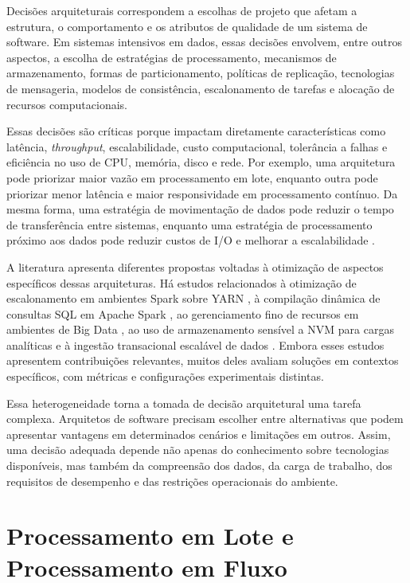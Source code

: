 Decisões arquiteturais correspondem a escolhas de projeto que afetam a estrutura, o comportamento e os atributos de qualidade de um sistema de software. Em sistemas intensivos em dados, essas decisões envolvem, entre outros aspectos, a escolha de estratégias de processamento, mecanismos de armazenamento, formas de particionamento, políticas de replicação, tecnologias de mensageria, modelos de consistência, escalonamento de tarefas e alocação de recursos computacionais.

Essas decisões são críticas porque impactam diretamente características como latência, \textit{throughput}, escalabilidade, custo computacional, tolerância a falhas e eficiência no uso de CPU, memória, disco e rede. Por exemplo, uma arquitetura pode priorizar maior vazão em processamento em lote, enquanto outra pode priorizar menor latência e maior responsividade em processamento contínuo. Da mesma forma, uma estratégia de movimentação de dados pode reduzir o tempo de transferência entre sistemas, enquanto uma estratégia de processamento próximo aos dados pode reduzir custos de I/O e melhorar a escalabilidade \cite{haynes2016pipegen,vincon2020nkv}.

A literatura apresenta diferentes propostas voltadas à otimização de aspectos específicos dessas arquiteturas. Há estudos relacionados à otimização de escalonamento em ambientes Spark sobre YARN \cite{wang2018hard}, à compilação dinâmica de consultas SQL em Apache Spark \cite{schiavio2020dynamic}, ao gerenciamento fino de recursos em ambientes de Big Data \cite{lyu2022fine}, ao uso de armazenamento sensível a NVM para cargas analíticas \cite{gotze2018nvm-aware} e à ingestão transacional escalável de dados \cite{li2022karst}. Embora esses estudos apresentem contribuições relevantes, muitos deles avaliam soluções em contextos específicos, com métricas e configurações experimentais distintas.

Essa heterogeneidade torna a tomada de decisão arquitetural uma tarefa complexa. Arquitetos de software precisam escolher entre alternativas que podem apresentar vantagens em determinados cenários e limitações em outros. Assim, uma decisão adequada depende não apenas do conhecimento sobre tecnologias disponíveis, mas também da compreensão dos dados, da carga de trabalho, dos requisitos de desempenho e das restrições operacionais do ambiente.

\section{Processamento em Lote e Processamento em Fluxo}
\label{sec:batch-streaming}

